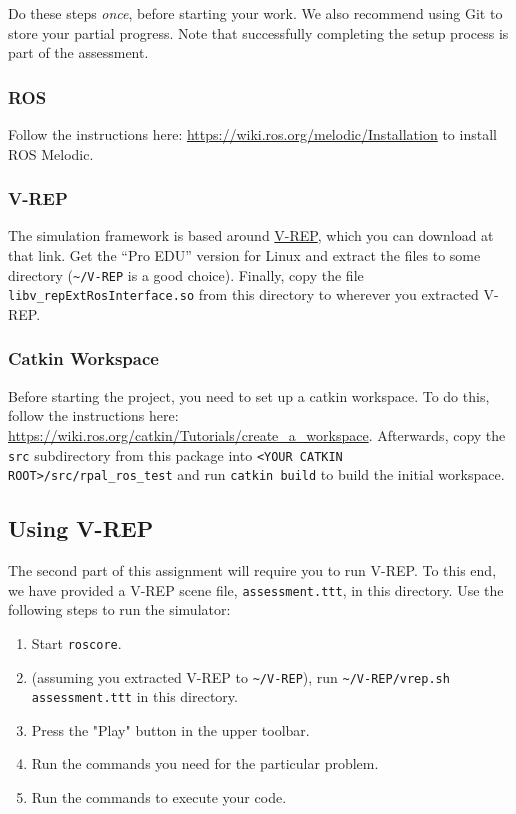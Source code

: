\documentclass[11pt]{article}
\begin{document}
Do these steps \emph{once}, before starting your work. We also recommend using Git to store your
partial progress. Note that successfully completing the setup process is part of the assessment.

\subsubsection{ROS}

Follow the instructions here: \url{https://wiki.ros.org/melodic/Installation} to install ROS
Melodic.

\subsubsection{V-REP}

The simulation framework is based around
\href{http://www.coppeliarobotics.com/downloads.html}{V-REP}, which you can download at that link.
Get the ``Pro EDU'' version for Linux and extract the files to some directory
(\texttt{\textasciitilde/V-REP} is a good choice). Finally, copy the file
\texttt{libv\_repExtRosInterface.so} from this directory to wherever you extracted V-REP.

\subsubsection{Catkin Workspace}

Before starting the project, you need to set up a catkin workspace. To do this, follow the
instructions here: \url{https://wiki.ros.org/catkin/Tutorials/create_a_workspace}. Afterwards, copy
the \texttt{src} subdirectory from this package into \texttt{<YOUR CATKIN ROOT>/src/rpal\_ros\_test}
and run \texttt{catkin build} to build the initial workspace.

\subsection{Using V-REP}

The second part of this assignment will require you to run V-REP. To this end, we have provided a
V-REP scene file, \texttt{assessment.ttt}, in this directory. Use the following steps to run the
simulator:
\begin{enumerate}
  \item Start \texttt{roscore}.
  \item (assuming you extracted V-REP to \texttt{\textasciitilde/V-REP}), run
  \texttt{\textasciitilde/V-REP/vrep.sh assessment.ttt} in this directory.
  \item Press the "Play" button in the upper toolbar.
  \item Run the commands you need for the particular problem.
  \item Run the commands to execute your code.
\end{enumerate}  
\end{document}
